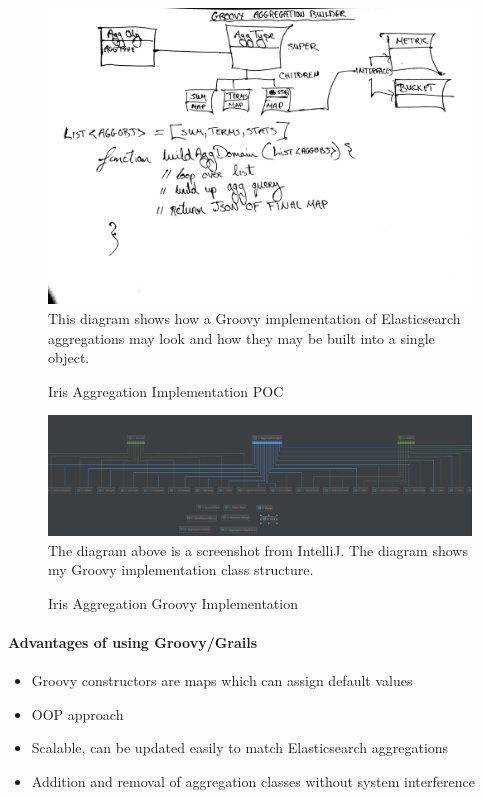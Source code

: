 \documentclass[12pt,a4paper,titlepage]{report}
\begin{document}
\begin{figure}[H]
\begin{tcolorbox}
\includegraphics[width=\textwidth,height=\textheight,keepaspectratio]{groovy_agg_builder_logic_1}
This diagram shows how a Groovy implementation of Elasticsearch aggregations may look and how they may be built into a single object.
\end{tcolorbox}
\caption{Iris Aggregation Implementation POC}
\end{figure}
\begin{figure}[H]
\begin{tcolorbox}
\includegraphics[width=\textwidth,height=\textheight,keepaspectratio]{intellij_agg_diagram}
The diagram above is a screenshot from IntelliJ. The diagram shows my Groovy implementation class structure.
\end{tcolorbox}
\caption{Iris Aggregation Groovy Implementation}
\end{figure}
\paragraph{Advantages of using Groovy/Grails}
\begin{itemize}
  \item Groovy constructors are maps which can assign default values
  \item OOP approach
  \item Scalable, can be updated easily to match Elasticsearch aggregations
  \item Addition and removal of aggregation classes without system interference
\end{itemize}
\end{document}
